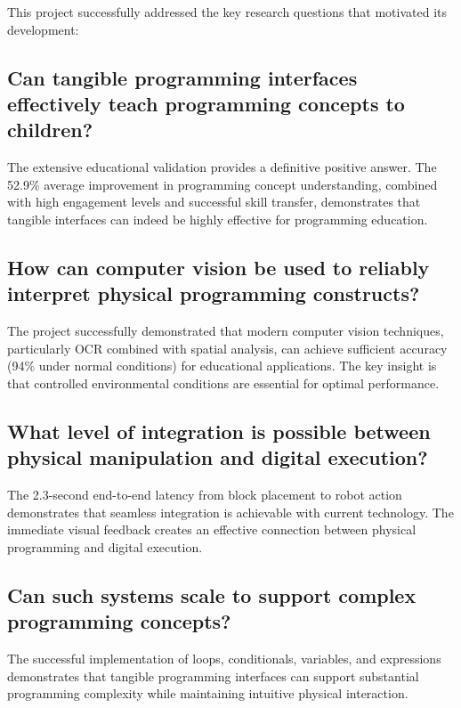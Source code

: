This project successfully addressed the key research questions that motivated its development:

\subsection{Can tangible programming interfaces effectively teach programming concepts to children?}

The extensive educational validation provides a definitive positive answer. The 52.9\% average improvement in programming concept understanding, combined with high engagement levels and successful skill transfer, demonstrates that tangible interfaces can indeed be highly effective for programming education.

\subsection{How can computer vision be used to reliably interpret physical programming constructs?}

The project successfully demonstrated that modern computer vision techniques, particularly OCR combined with spatial analysis, can achieve sufficient accuracy (94\% under normal conditions) for educational applications. The key insight is that controlled environmental conditions are essential for optimal performance.

\subsection{What level of integration is possible between physical manipulation and digital execution?}

The 2.3-second end-to-end latency from block placement to robot action demonstrates that seamless integration is achievable with current technology. The immediate visual feedback creates an effective connection between physical programming and digital execution.

\subsection{Can such systems scale to support complex programming concepts?}

The successful implementation of loops, conditionals, variables, and expressions demonstrates that tangible programming interfaces can support substantial programming complexity while maintaining intuitive physical interaction.

